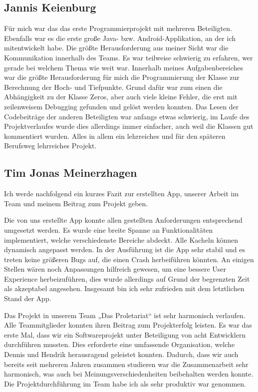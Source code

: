 \subsection{Jannis Keienburg}
Für mich war das das erste Programmierprojekt mit mehreren Beteiligten. Ebenfalls war es die erste große Java- bzw. Android-Applikation, an der ich mitentwickelt habe. Die größte Herausforderung aus meiner Sicht war die Kommunikation innerhalb des Teams. Es war teilweise schwierig zu erfahren, wer gerade bei welchem Thema wie weit war. Innerhalb meines Aufgabenbereiches war die größte Herausforderung für mich die Programmierung der Klasse zur Berechnung der Hoch- und Tiefpunkte. Grund dafür war zum einen die Abhängigkeit zu der Klasse Zeros, aber auch viele kleine Fehler, die erst mit zeilenweisem Debugging gefunden und gelöst werden konnten. Das Lesen der Codebeiträge der anderen Beteiligten war anfangs etwas schwierig, im Laufe des Projektverlaufes wurde dies allerdings immer einfacher, auch weil die Klassen gut kommentiert wurden. Alles in allem ein lehrreiches und für den späteren Berufsweg lehrreiches Projekt.

\subsection{Tim Jonas Meinerzhagen}
Ich werde nachfolgend ein kurzes Fazit zur erstellten App, unserer Arbeit im Team und meinem Beitrag zum Projekt geben.

Die von uns erstellte App konnte allen gestellten Anforderungen entsprechend umgesetzt werden. Es wurde eine breite Spanne an Funktionalitäten implementiert, welche verschiedenste Bereiche abdeckt. Alle Kacheln können dynamisch angepasst werden. In der Ausführung ist die App sehr stabil und es treten keine größeren Bugs auf, die einen Crash herbeiführen könnten. An einigen Stellen wären noch Anpassungen hilfreich gewesen, um eine bessere User Experience herbeizuführen, dies wurde allerdings auf Grund der begrenzten Zeit als akzeptabel angesehen. Insgesamt bin ich sehr zufrieden mit dem letztlichen Stand der App.

Das Projekt in unserem Team „Das Proletariat“ ist sehr harmonisch verlaufen. Alle Teammitglieder konnten ihren Beitrag zum Projekterfolg leisten. Es war das erste Mal, dass wir ein Softwareprojekt unter Beteiligung von acht Entwicklern durchführen mussten. Dies erforderte eine umfassende Organisation, welche Dennis und Hendrik herausragend geleistet konnten. Dadurch, dass wir auch bereits seit mehreren Jahren zusammen studieren war die Zusammenarbeit sehr harmonisch, was auch bei Meinungsverschiedenheiten beibehalten werden konnte.  Die Projektdurchführung im Team habe ich als sehr produktiv war genommen.

